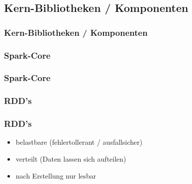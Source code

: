 \documentclass[hyperref={pdfpagelabels=false}]{beamer}
\begin{document}
\subsection{Kern-Bibliotheken / Komponenten}
\begin{frame} 
\frametitle{Kern-Bibliotheken / Komponenten}



\begin{figure}[h]
  \centering
\end{figure}



\end{frame}

\subsubsection{Spark-Core}
\begin{frame} 
\frametitle{Spark-Core}


\begin{figure}[h]
  \centering
\end{figure}

\end{frame}

\subsubsection{RDD’s}
\begin{frame} 
\frametitle{RDD’s}

\begin{itemize}
	\item belastbare (fehlertollerant / ausfallsicher)
	\item verteilt (Daten lassen sich aufteilen)
	\item nach Erstellung nur lesbar
\end{itemize}

\end{frame}
\end{document}
